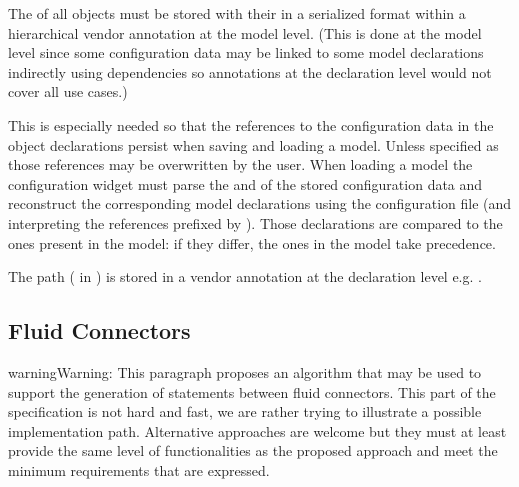 \documentclass[letterpaper,10pt, openany,english]{sphinxmanual}
\begin{document}

The  of all objects must be stored with their  in a serialized format within a hierarchical vendor annotation at the model level. (This is done at the model level since some configuration data may be linked to some model declarations indirectly using dependencies so annotations at the declaration level would not cover all use cases.)

This is especially needed so that the references to the configuration data in the object declarations persist when saving and loading a model. Unless specified as  those references may be overwritten by the user. When loading a model the configuration widget must parse the  and  of the stored configuration data and reconstruct the corresponding model declarations using the configuration file (and interpreting the references prefixed by \sphinxcode{\sphinxupquote{\#}}). Those declarations are compared to the ones present in the model: if they differ, the ones in the model take precedence.


The path ( in {\hyperref[\detokenize{requirements:configuration-data}]{}}) is stored in a vendor annotation at the declaration level e.g. .


\subsection{Fluid Connectors}
\label{\detokenize{requirements:fluid-connectors}}\label{\detokenize{requirements:sec-fluid-connectors}}
\begin{sphinxadmonition}{warning}{Warning:}
This paragraph proposes an algorithm that may be used to support the generation of  statements between fluid connectors. This part of the specification is not hard and fast, we are rather trying to illustrate a possible implementation path. Alternative approaches are welcome but they must at least provide the same level of functionalities as the proposed approach and meet the minimum requirements that are expressed.
\end{sphinxadmonition}
\end{document}
